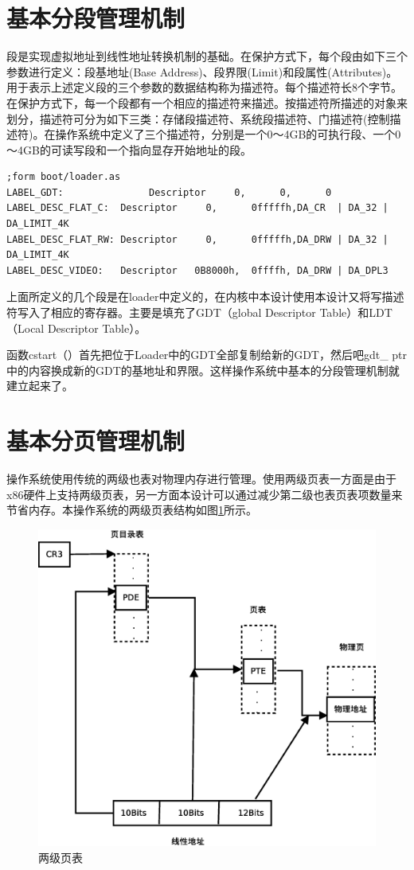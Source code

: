 \documentclass[UTF8,nofonts,cs4size]{ctexrep}
\begin{document}
\section{基本分段管理机制}
段是实现虚拟地址到线性地址转换机制的基础。在保护方式下，每个段由如下三个参数进行定义：段基地址(Base Address)、段界限(Limit)和段属性(Attributes)。用于表示上述定义段的三个参数的数据结构称为描述符。每个描述符长8个字节。在保护方式下，每一个段都有一个相应的描述符来描述。按描述符所描述的对象来划分，描述符可分为如下三类：存储段描述符、系统段描述符、门描述符(控制描述符)。在操作系统中定义了三个描述符，分别是一个0～4GB的可执行段、一个0～4GB的可读写段和一个指向显存开始地址的段。
\begin{lstlisting}
;form boot/loader.as
LABEL_GDT:               Descriptor     0,      0,      0
LABEL_DESC_FLAT_C:	Descriptor     0,      0fffffh,DA_CR  | DA_32 | DA_LIMIT_4K
LABEL_DESC_FLAT_RW:	Descriptor     0,      0fffffh,DA_DRW | DA_32 | DA_LIMIT_4K
LABEL_DESC_VIDEO:	Descriptor	 0B8000h,  0ffffh, DA_DRW | DA_DPL3	         
\end{lstlisting}
上面所定义的几个段是在loader中定义的，在内核中本设计使用本设计又将写描述符写入了相应的寄存器。主要是填充了GDT（global Descriptor Table）和LDT（Local Descriptor Table）。

函数cstart（）首先把位于Loader中的GDT全部复制给新的GDT，然后吧gdt\_ ptr中的内容换成新的GDT的基地址和界限。这样操作系统中基本的分段管理机制就建立起来了。
\section{基本分页管理机制}
操作系统使用传统的两级也表对物理内存进行管理。使用两级页表一方面是由于x86硬件上支持两级页表，另一方面本设计可以通过减少第二级也表页表项数量来节省内存。本操作系统的两级页表结构如图\ref{page}所示。
\begin{figure}[htp]
\centering
\includegraphics[scale=0.4]{page.eps}
\caption{两级页表}
\label{page}
\end{figure}
\end{document}

